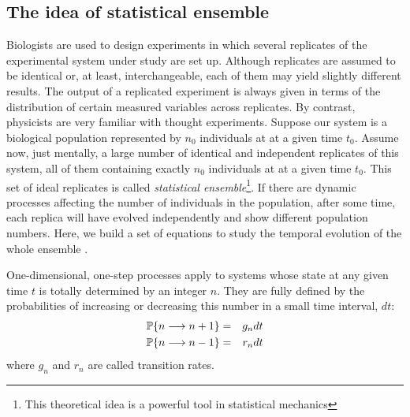 \subsection{The idea of statistical ensemble}
\label{master_equation}
Biologists are used to design experiments in which several replicates of the experimental system under study are set up. Although replicates are assumed to be identical or, at least, interchangeable, each of them may yield slightly different results. The output of a replicated experiment is always given in terms of the distribution of certain measured variables across replicates. By contrast, physicists are very familiar with thought experiments. Suppose our system is a biological population represented by $n_0$ individuals at at a given time $t_0$. Assume now, just mentally, a large number of identical and independent replicates of this system, all of them containing exactly $n_0$ individuals at at a given time $t_0$. This set of ideal replicates is called {\em statistical ensemble}\footnote{This theoretical idea is a powerful tool in statistical mechanics}. If there are dynamic processes affecting the number of individuals in the population, after some time, each replica will have evolved independently and show different population numbers. Here, we build a set of equations to study the temporal evolution of the whole ensemble \citep{Allen87}. 
\smallskip

One-dimensional, one-step processes apply to systems whose state at any given time $t$ is totally determined by an integer $n$. They are fully defined by the probabilities of increasing or decreasing this number in a small time interval, $dt$:
\begin{eqnarray}
    {\mathbb P}\{ n \longrightarrow n+1 \} & = & g_n dt \nonumber\\
    {\mathbb P}\{ n \longrightarrow n-1 \} & = & r_n dt
\label{eq:pb}
\end{eqnarray}
where $g_n$ and $r_n$ are called transition rates. 
\smallskip


